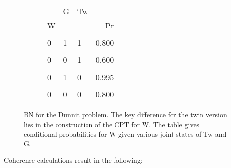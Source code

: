 \documentclass[10pt,]{scrartcl}
\begin{document}
\begin{figure}
\hspace{-1cm}\begin{subfigure}[!ht]{0.3\textwidth}
\begin{table}[H]
\centering
\begin{tabular}{lllr}
\toprule
\multicolumn{1}{c}{} & \multicolumn{1}{c}{G} & \multicolumn{1}{c}{Tw} & \multicolumn{1}{c}{} \\
W &  &  & Pr\\
\midrule
\cellcolor{gray!6}{1} & \cellcolor{gray!6}{1} & \cellcolor{gray!6}{1} & \cellcolor{gray!6}{0.200}\\
0 & 1 & 1 & 0.800\\
\cellcolor{gray!6}{1} & \cellcolor{gray!6}{0} & \cellcolor{gray!6}{1} & \cellcolor{gray!6}{0.400}\\
0 & 0 & 1 & 0.600\\
\cellcolor{gray!6}{1} & \cellcolor{gray!6}{1} & \cellcolor{gray!6}{0} & \cellcolor{gray!6}{0.005}\\
0 & 1 & 0 & 0.995\\
\cellcolor{gray!6}{1} & \cellcolor{gray!6}{0} & \cellcolor{gray!6}{0} & \cellcolor{gray!6}{0.200}\\
0 & 0 & 0 & 0.800\\
\bottomrule
\end{tabular}
\end{table}
\end{subfigure}
\caption{BN for the \textsf{Dunnit} problem. The key difference for the twin version lies in the construction of the CPT for \textsf{W}. The table gives conditional probabilities for \textsf{W} given various joint states of \textsf{Tw} and \textsf{G}.}
\label{fig:twin}
\end{figure}

\newpage

Coherence calculations result in the following:

\begin{table}[H]
\centering
{}
\end{table}
\end{document}
